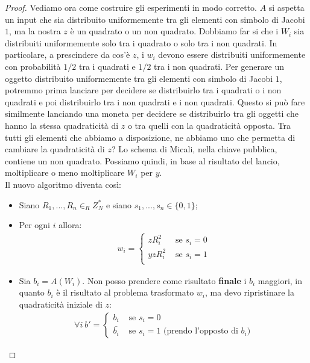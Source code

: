 \begin{proof}
Vediamo ora come costruire gli esperimenti in modo corretto. $A$ si aspetta un input che sia distribuito uniformemente tra gli elementi con simbolo di Jacobi $1$, ma la nostra $z$ è un quadrato o un non quadrato. Dobbiamo far si che i $W_i$ sia distribuiti uniformemente solo tra i quadrato o solo tra i non quadrati. In particolare, a prescindere da cos'è $z$, i $w_i$ devono essere distribuiti uniformemente con probabilità $1/2$ tra i quadrati e $1/2$ tra i non quadrati. Per generare un oggetto distribuito uniformemente tra gli elementi con simbolo di Jacobi $1$, potremmo prima lanciare per decidere se distribuirlo tra i quadrati o i non quadrati e poi distribuirlo tra i non quadrati e i non quadrati. Questo si può fare similmente lanciando una moneta per decidere se distribuirlo tra gli oggetti che hanno la stessa quadraticità di $z$ o tra quelli con la quadraticità opposta. Tra tutti gli elementi che abbiamo a disposizione, ne abbiamo uno che permetta di cambiare la quadraticità di $z$? Lo schema di Micali, nella chiave pubblica, contiene un non quadrato. Possiamo quindi, in base al risultato del lancio, moltiplicare o meno moltiplicare $W_i$ per $y$.\\

\noindent Il nuovo algoritmo diventa così:
\begin{itemize}
    \item Siano $R_1, ..., R_n \in_R Z_N^*$ e siano $s_1, ..., s_n \in \{0, 1\}$;
    \item Per ogni $i$ allora:
    \begin{align*}
        w_i = \begin{cases}
                zR_i^2 & \text{ se } s_i = 0\\
                yzR_i^2 & \text{ se } s_i = 1\\
        \end{cases}
    \end{align*}
    \item Sia $b_i = A(W_i)$. Non posso prendere come risultato \textbf{finale} i $b_i$ maggiori, in quanto $b_i$ è il risultato al problema trasformato $w_i$, ma devo ripristinare la quadraticità iniziale di $z$:
    \begin{align*}
        \forall i \ b' = \begin{cases}
                b_i & \text{ se } s_i = 0\\
                \bar{b_i}  & \text{ se } s_i = 1 \text{ (prendo l'opposto di $b_i$)}
        \end{cases}
    \end{align*}
\end{itemize}


\end{proof}
